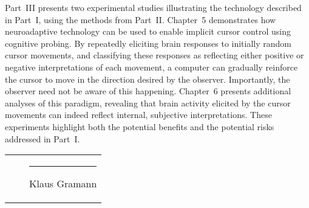 \documentclass[a4paper,11pt]{article}
\begin{document}
Part~III presents two experimental studies illustrating the technology described in Part~I, using the methods from Part~II. Chapter~5 demonstrates how neuroadaptive technology can be used to enable implicit cursor control using cognitive probing. By repeatedly eliciting brain responses to initially random cursor movements, and classifying these responses as reflecting either positive or negative interpretations of each movement, a computer can gradually reinforce the cursor to move in the direction desired by the observer. Importantly, the observer need not be aware of this happening. Chapter~6 presents additional analyses of this paradigm, revealing that brain activity elicited by the cursor movements can indeed reflect internal, subjective interpretations. These experiments highlight both the potential benefits and the potential risks addressed in Part~I.

\vfill

\begin{tabularx}{\textwidth}{XXX}
& & \hrule Klaus Gramann \\
\end{tabularx}

\vspace{5cm}
\end{document}
